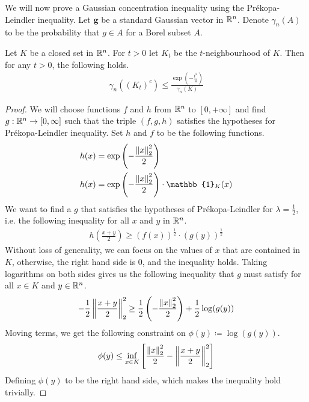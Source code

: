 \documentclass[11pt]{article}
\begin{document}
We will now prove a Gaussian concentration inequality using the Pr\'ekopa-Leindler inequality.
Let $\mathbf{g}$ be a standard Gaussian vector in $\mathbb{R}^n$.
Denote $\gamma_n(A)$ to be the probability that $g \in A$ for a Borel subset $A$.
\begin{theorem}
  \label{thm:guassian-geometric}
  Let $K$ be a closed set in $\mathbb{R}^n$.
  For $t > 0$ let $K_t$ be the $t$-neighbourhood of $K$.
  Then for any $t > 0$, the following holds.
  \begin{align*}
    \gamma_n\left( \left( K_t \right)^c \right) \leq \frac{\exp\left( - \frac{t^2}{4} \right)}{\gamma_n(K)}
  \end{align*}
\end{theorem}
\begin{proof}
  We will choose functions $f$ and $h$ from $\mathbb{R}^n$ to $[0, +\infty]$ and find $g: \mathbb{R}^n \to [0, \infty]$ such that the triple $(f,g,h)$ satisfies the hypotheses for Pr\'ekopa-Leindler inequality.
  Set $h$ and $f$ to be the following functions.
  \begin{align*}
    h(x) &= \exp\left( - \frac{\norm{x}_2^2}{2} \right) \\
    h(x) &= \exp\left( - \frac{\norm{x}_2^2}{2} \right) \cdot \mathbb{1}_K(x)
  \end{align*}
  We want to find a $g$ that satisfies the hypotheses of Pr\'ekopa-Leindler for $\lambda = \frac{1}{2}$, i.e. the following inequality for all $x$ and $y$ in $\mathbb{R}^n$.
  \begin{align*}
    h\left( \frac{x+y}{2} \right) \geq \left( f(x) \right)^{\frac{1}{2}} \cdot \left( g(y) \right)^{\frac{1}{2}}
  \end{align*}
  Without loss of generality, we can focus on the values of $x$ that are contained in $K$, otherwise, the right hand side is $0$, and the inequality holds.
  Taking logarithms on both sides gives us the following inequality that $g$ must satisfy for all $x \in K$ and $y \in \mathbb{R}^n$.
  \begin{align*}
    - \frac{1}{2} \left\lVert\frac{x+y}{2}\right\rVert_2^2
    \geq \frac{1}{2}\left( - \frac{\left\lVert x\right\rVert_2^2}{2} \right) + \frac{1}{2} \log(g(y))
  \end{align*}
  Moving terms, we get the following constraint on $\phi(y) \coloneqq \log(g(y))$.
  \begin{align*}
    \phi(y) \leq \inf_{x \in K} \left[ \frac{\left\lVert x\right\rVert_2^2}{2} - \left\lVert\frac{x+y}{2}\right\rVert_2^2 \right]
  \end{align*}
  Defining $\phi(y)$ to be the right hand side, which makes the inequality hold trivially.

\end{proof}
\end{document}
